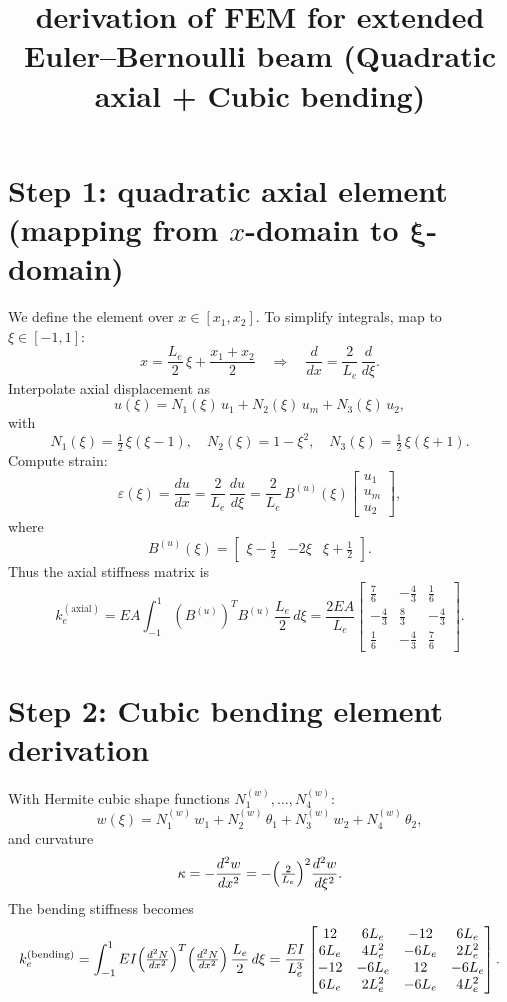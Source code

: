 \documentclass{article}
\title{derivation of FEM for extended Euler--Bernoulli beam (Quadratic axial + Cubic bending)}
\author{}
\date{}
\begin{document}
	\maketitle
	
	\section*{Step 1: quadratic axial element (mapping from \(x\)-domain to \(\boldsymbol{\xi}\)-domain)}
	
	We define the element over \(x\in[x_1,x_2]\).  To simplify integrals, map to \(\xi\in[-1,1]\):
	\[
	x = \frac{L_e}{2}\,\xi + \frac{x_1+x_2}{2}
	\quad\Longrightarrow\quad
	\frac{d}{dx} = \frac{2}{L_e}\,\frac{d}{d\xi}.
	\]
	Interpolate axial displacement as
	\[
	u(\xi) = N_1(\xi)\,u_1 + N_2(\xi)\,u_m + N_3(\xi)\,u_2,
	\]
	with
	\[
	N_1(\xi)=\tfrac12\,\xi(\xi-1),\quad
	N_2(\xi)=1-\xi^2,\quad
	N_3(\xi)=\tfrac12\,\xi(\xi+1).
	\]
	Compute strain:
	\[
	\varepsilon(\xi)
	= \frac{du}{dx}
	= \frac{2}{L_e}\,\frac{du}{d\xi}
	= \frac{2}{L_e}\,B^{(u)}(\xi)
	\begin{bmatrix}u_1\\u_m\\u_2\end{bmatrix},
	\]
	where
	\[
	B^{(u)}(\xi)
	= \begin{bmatrix}\xi-\tfrac12 & -2\xi & \xi+\tfrac12\end{bmatrix}.
	\]
	Thus the axial stiffness matrix is
	\[
	k_e^{(\mathrm{axial})}
	= EA \int_{-1}^1 (B^{(u)})^T B^{(u)}\,\frac{L_e}{2}\,d\xi
	= \frac{2EA}{L_e}
	\begin{bmatrix}
		\tfrac76 & -\tfrac43 & \tfrac16\\
		-\tfrac43 & \tfrac83 & -\tfrac43\\
		\tfrac16 & -\tfrac43 & \tfrac76
	\end{bmatrix}.
	\]
	
	\section*{Step 2: Cubic bending element derivation}
	
	With Hermite cubic shape functions \(N_1^{(w)},\dots,N_4^{(w)}\):
	\[
	w(\xi)
	= N_1^{(w)}\,w_1 + N_2^{(w)}\,\theta_1
	+ N_3^{(w)}\,w_2 + N_4^{(w)}\,\theta_2,
	\]
	and curvature
	\[
	\kappa = -\frac{d^2w}{dx^2}
	= -\Bigl(\tfrac{2}{L_e}\Bigr)^2 \frac{d^2w}{d\xi^2}.
	\]
	The bending stiffness becomes
	\[
	k_e^{(\mathrm{bending})}
	= \int_{-1}^1 EI
	\Bigl(\tfrac{d^2N}{dx^2}\Bigr)^T
	\Bigl(\tfrac{d^2N}{dx^2}\Bigr)\,\frac{L_e}{2}\,d\xi
	= \frac{EI}{L_e^3}
	\begin{bmatrix}
		12     & 6L_e   & -12   & 6L_e \\
		6L_e   & 4L_e^2 & -6L_e & 2L_e^2 \\
		-12    & -6L_e  & 12    & -6L_e \\
		6L_e   & 2L_e^2 & -6L_e & 4L_e^2
	\end{bmatrix}.
	\]
	
\end{document}
